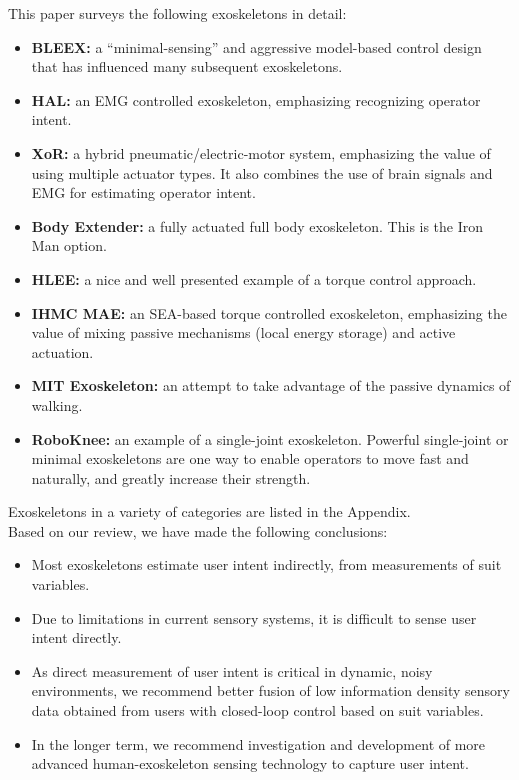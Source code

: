 \documentclass[letterpaper,12pt,fullpage]{article}
\begin{document}
This paper surveys the following exoskeletons in detail:
\begin{itemize}
\item
{\bf BLEEX:} a ``minimal-sensing'' and aggressive model-based control design that has influenced many subsequent exoskeletons.
\item
{\bf HAL:} an EMG controlled exoskeleton, emphasizing recognizing operator intent.
\item
{\bf XoR:} a hybrid pneumatic/electric-motor system, emphasizing the
value of using multiple actuator types. It also combines the use
of brain signals and EMG for estimating operator intent.
\item
{\bf Body Extender:} a fully actuated full body exoskeleton. This is the
Iron Man option.
\item
{\bf HLEE:} a nice and well presented example of a torque control approach.
\item
{\bf IHMC MAE:} an SEA-based torque controlled exoskeleton, emphasizing
the value of mixing passive mechanisms (local energy storage) and active
actuation.
\item
{\bf MIT Exoskeleton:} an attempt to take advantage of the passive dynamics
of walking.
\item
{\bf RoboKnee:} an example of a single-joint exoskeleton. Powerful single-joint
or minimal exoskeletons are one way to enable operators to move fast
and naturally, and greatly increase their strength.
\end{itemize}

\noindent Exoskeletons in a variety of categories are listed in the Appendix.\\

\noindent Based on our review, we have made the following conclusions:
\begin{itemize}
\item Most exoskeletons estimate user intent indirectly, from measurements of suit variables.
\item Due to limitations in current sensory systems, it is difficult to sense user intent directly. 
\item As direct measurement of user intent is critical in dynamic, noisy environments, we recommend better fusion of low information density sensory data obtained from users with closed-loop control based on suit variables.
\item In the longer term, we recommend investigation and development of more advanced human-exoskeleton sensing technology to capture user intent.
\end{itemize}
\end{document}
